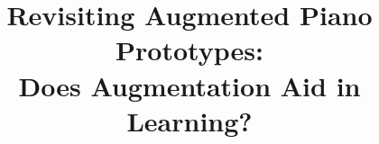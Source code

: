 \documentclass[sigconf, screen, review]{acmart}
\begin{document}
\title[Revisiting Augmented Piano Prototypes]{Revisiting Augmented Piano Prototypes:\\Does Augmentation Aid in Learning? }




\end{document}
